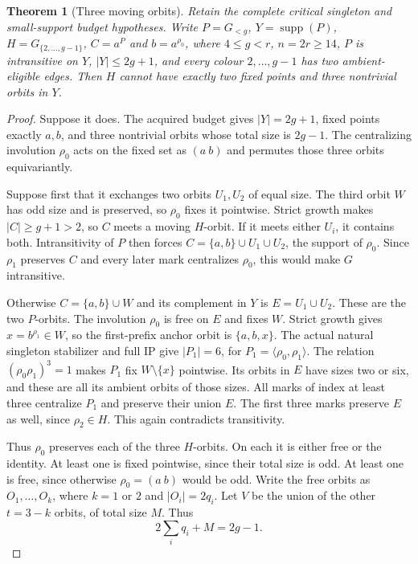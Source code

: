 \documentclass[11pt,a4paper]{article}
\newtheorem{theorem}[lemma]{Theorem}
\newcommand{\gen}[1]{\langle#1\rangle}
\begin{document}
\begin{theorem}[Three moving orbits]\label{three}
Retain the complete critical singleton and small-support budget
hypotheses. Write $P=G_{<g}$, $Y=\operatorname{supp}(P)$,
$H=G_{\{2,\ldots,g-1\}}$, $C=a^P$ and $b=a^{\rho_0}$,
where $4\le g<r$, $n=2r\ge14$, $P$ is intransitive on
$Y$, $|Y|\le2g+1$, and every colour $2,\ldots,g-1$ has
two ambient-eligible edges. Then $H$ cannot have exactly two
fixed points and three nontrivial orbits in $Y$.
\end{theorem}
\begin{proof}
Suppose it does. The acquired budget gives $|Y|=2g+1$,
fixed points exactly $a,b$, and three nontrivial orbits whose
total size is $2g-1$. The centralizing involution $\rho_0$
acts on the fixed set as $(a\ b)$ and permutes those three
orbits equivariantly.

Suppose first that it exchanges two orbits $U_1,U_2$ of equal
size. The third orbit $W$ has odd size and is preserved, so
$\rho_0$ fixes it pointwise. Strict growth makes $|C|\ge g+1>2$,
so $C$ meets a moving $H$-orbit. If it meets either $U_i$,
it contains both. Intransitivity of $P$ then forces
$C=\{a,b\}\cup U_1\cup U_2$, the support of $\rho_0$.
Since $\rho_1$ preserves $C$ and every later mark centralizes
$\rho_0$, this would make $G$ intransitive.

Otherwise $C=\{a,b\}\cup W$ and its complement in $Y$ is
$E=U_1\cup U_2$. These are the two $P$-orbits. The involution
$\rho_0$ is free on $E$ and fixes $W$. Strict growth gives
$x=b^{\rho_1}\in W$, so the first-prefix anchor orbit is
$\{a,b,x\}$. The actual natural singleton stabilizer and full
IP give $|P_1|=6$, for $P_1=\gen{\rho_0,\rho_1}$.
The relation $(\rho_0\rho_1)^3=1$ makes $P_1$ fix
$W\setminus\{x\}$ pointwise. Its orbits in $E$ have sizes
two or six, and these are all its ambient orbits of those sizes.
All marks of index at least three centralize $P_1$ and preserve
their union $E$. The first three marks preserve $E$ as well,
since $\rho_2\in H$. This again contradicts transitivity.

Thus $\rho_0$ preserves each of the three $H$-orbits.
On each it is either free or the identity. At least one is fixed
pointwise, since their total size is odd. At least one is free,
since otherwise $\rho_0=(a\ b)$ would be odd. Write the
free orbits as $O_1,\ldots,O_k$, where $k=1$ or $2$ and
$|O_i|=2q_i$. Let $V$ be the union of the other $t=3-k$
orbits, of total size $M$. Thus
\[
                  2\sum_i q_i+M=2g-1.                  \tag{2}
\]


\end{proof}
\end{document}
